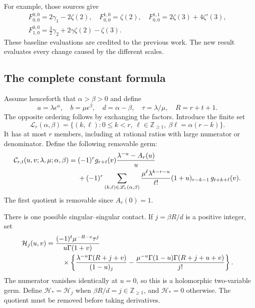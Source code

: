 \documentclass[11pt,a4paper]{article}
\numberwithin{equation}{section}
\theoremstyle{definition}
\theoremstyle{remark}
\begin{document}
For example, those sources give
\begin{equation}\label{mc:FP-values}
 \begin{gathered}
 F_{0,0}^{0,0}=2\gamma_1-2\zeta(2),\quad
 F_{0,0}^{1,0}=\zeta(2),\quad
 F_{0,0}^{1,1}=2\zeta(3)+4\zeta'(3),\\
 F_{1,0}^{0,0}=\tfrac32\gamma_2+2\gamma\zeta(2)-\zeta(3).
 \end{gathered}
\end{equation}
These baseline evaluations are credited to the previous work.
The new result evaluates every change caused by the different scales.

\subsection{The complete constant formula}

Assume henceforth that $\alpha>\beta>0$ and define
\begin{equation}\label{mc:scales}
 a=\lambda\epsilon^\alpha,\quad b=\mu\epsilon^\beta,
 \quad d=\alpha-\beta,\quad \tau=\lambda/\mu,
 \quad R=r+t+1.
\end{equation}
The opposite ordering follows by exchanging the factors.
Introduce the finite set
\begin{equation}\label{mc:resonance-set}
 \mathscr L_r(\alpha,\beta)
 =\{(k,\ell):0\le k<r,\ \ell\in\mathbb Z_{\ge1},\
                      \beta\ell=\alpha(r-k)\}.
\end{equation}
It has at most $r$ members, including at rational ratios with
large numerator or denominator. Define the following removable germ:
\begin{align}\label{mc:mixed-contact}
 \mathcal C_{r,t}(u,v;\lambda,\mu;\alpha,\beta)
 ={}&(-1)^r g_{r+t}(v)
                  \frac{\lambda^{-u}-A_r(u)}u\notag\\
 &+(-1)^r\sum_{(k,\ell)\in\mathscr L_r(\alpha,\beta)}
   \frac{\mu^\ell\lambda^{k-r-u}}{\ell!}
                 (1+u)_{r-k-1}\,g_{t+k+\ell}(v).
\end{align}
The first quotient is removable since $A_r(0)=1$.

There is one possible singular--singular contact. If
$j=\beta R/d$ is a positive integer, set
\begin{align}\label{mc:singular-contact}
 \mathcal H_j(u,v)={}&
 \frac{(-1)^t\mu^{-R-v}\tau^j}{u\Gamma(1+v)}\notag\\
 &\quad\times\left\{
 \frac{\lambda^{-u}\Gamma(R+j+v)}{(1-u)_j}
 -\frac{\mu^{-u}\Gamma(1-u)\Gamma(R+j+u+v)}{j!}
                 \right\}.
\end{align}
The numerator vanishes identically at $u=0$, so this is a
holomorphic two-variable germ. Define $\mathcal H_*=\mathcal H_j$
when $\beta R/d=j\in\mathbb Z_{\ge1}$, and $\mathcal H_*=0$
otherwise. The quotient must be removed before taking derivatives.
\end{document}
